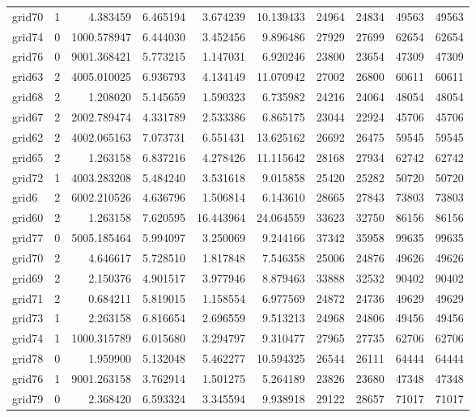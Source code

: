 \begin{longtable}{|l|r|r|r|r|r|r|r|r|r|}
grid70 & 1 & 4.383459 & 6.465194 & 3.674239 & 10.139433 & 24964 & 24834 & 49563 & 49563 \\
grid74 & 0 & 1000.578947 & 6.444030 & 3.452456 & 9.896486 & 27929 & 27699 & 62654 & 62654 \\
grid76 & 0 & 9001.368421 & 5.773215 & 1.147031 & 6.920246 & 23800 & 23654 & 47309 & 47309 \\
grid63 & 2 & 4005.010025 & 6.936793 & 4.134149 & 11.070942 & 27002 & 26800 & 60611 & 60611 \\
grid68 & 2 & 1.208020 & 5.145659 & 1.590323 & 6.735982 & 24216 & 24064 & 48054 & 48054 \\
grid67 & 2 & 2002.789474 & 4.331789 & 2.533386 & 6.865175 & 23044 & 22924 & 45706 & 45706 \\
grid62 & 2 & 4002.065163 & 7.073731 & 6.551431 & 13.625162 & 26692 & 26475 & 59545 & 59545 \\
grid65 & 2 & 1.263158 & 6.837216 & 4.278426 & 11.115642 & 28168 & 27934 & 62742 & 62742 \\
grid72 & 1 & 4003.283208 & 5.484240 & 3.531618 & 9.015858 & 25420 & 25282 & 50720 & 50720 \\
grid6 & 2 & 6002.210526 & 4.636796 & 1.506814 & 6.143610 & 28665 & 27843 & 73803 & 73803 \\
grid60 & 2 & 1.263158 & 7.620595 & 16.443964 & 24.064559 & 33623 & 32750 & 86156 & 86156 \\
grid77 & 0 & 5005.185464 & 5.994097 & 3.250069 & 9.244166 & 37342 & 35958 & 99635 & 99635 \\
grid70 & 2 & 4.646617 & 5.728510 & 1.817848 & 7.546358 & 25006 & 24876 & 49626 & 49626 \\
grid69 & 2 & 2.150376 & 4.901517 & 3.977946 & 8.879463 & 33888 & 32532 & 90402 & 90402 \\
grid71 & 2 & 0.684211 & 5.819015 & 1.158554 & 6.977569 & 24872 & 24736 & 49629 & 49629 \\
grid73 & 1 & 2.263158 & 6.816654 & 2.696559 & 9.513213 & 24968 & 24806 & 49456 & 49456 \\
grid74 & 1 & 1000.315789 & 6.015680 & 3.294797 & 9.310477 & 27965 & 27735 & 62706 & 62706 \\
grid78 & 0 & 1.959900 & 5.132048 & 5.462277 & 10.594325 & 26544 & 26111 & 64444 & 64444 \\
grid76 & 1 & 9001.263158 & 3.762914 & 1.501275 & 5.264189 & 23826 & 23680 & 47348 & 47348 \\
grid79 & 0 & 2.368420 & 6.593324 & 3.345594 & 9.938918 & 29122 & 28657 & 71017 & 71017 \\

\end{longtable}
